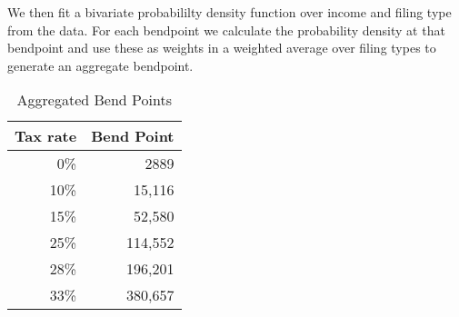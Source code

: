 \documentclass[12pt]{report}
\theoremstyle{definition}
\begin{document}
      We then fit a bivariate probabililty density function over income and filing type from the data.  For each bendpoint we calculate the probability density at that bendpoint and use these as weights in a weighted average over filing types to generate an aggregate bendpoint.
      \begin{table}[ht]
        \caption{Aggregated Bend Points}
        \label{Calib_Bend_Tab2}
        \centering
        \begin{tabular}{|r|r|} \hline 
          Tax rate & Bend Point \\ \hline 
          0\% & 2889 \\ \hline 
          10\% & 15,116 \\ \hline 
          15\% & 52,580 \\ \hline 
          25\% & 114,552 \\ \hline 
          28\% & 196,201 \\ \hline 
          33\% & 380,657 \\ \hline 
        \end{tabular}
      \end{table}

\clearpage

%  

\printindex
\end{document}
